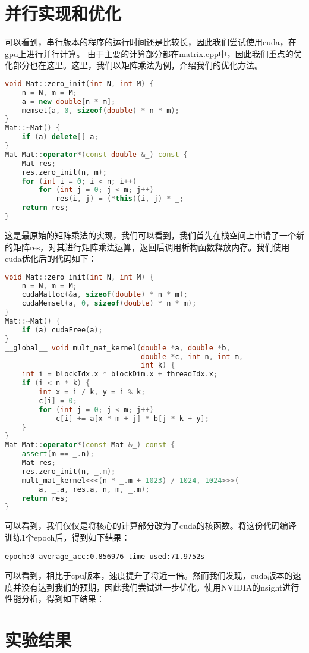 \documentclass{ctexart}
\begin{document}
\begin{sloppypar}
\section{并行实现和优化}
可以看到，串行版本的程序的运行时间还是比较长，因此我们尝试使用cuda，在gpu上进行并行计算。
由于主要的计算部分都在matrix.cpp中，因此我们重点的优化部分也在这里。这里，我们以矩阵乘法为例，介绍我们的优化方法。
\begin{lstlisting}[language=C++]
void Mat::zero_init(int N, int M) {
    n = N, m = M;
    a = new double[n * m];
    memset(a, 0, sizeof(double) * n * m);
}
Mat::~Mat() {
    if (a) delete[] a;
}
Mat Mat::operator*(const double &_) const {
    Mat res;
    res.zero_init(n, m);
    for (int i = 0; i < n; i++)
        for (int j = 0; j < m; j++)
            res(i, j) = (*this)(i, j) * _;
    return res;
}
\end{lstlisting}
这是最原始的矩阵乘法的实现，我们可以看到，我们首先在栈空间上申请了一个新的矩阵res，对其进行矩阵乘法运算，返回后调用析构函数释放内存。我们使用cuda优化后的代码如下：
\begin{lstlisting}[language=C++]
void Mat::zero_init(int N, int M) {
    n = N, m = M;
    cudaMalloc(&a, sizeof(double) * n * m);
    cudaMemset(a, 0, sizeof(double) * n * m);
}
Mat::~Mat() {
    if (a) cudaFree(a);
}
__global__ void mult_mat_kernel(double *a, double *b,
                                double *c, int n, int m,
                                int k) {
    int i = blockIdx.x * blockDim.x + threadIdx.x;
    if (i < n * k) {
        int x = i / k, y = i % k;
        c[i] = 0;
        for (int j = 0; j < m; j++)
            c[i] += a[x * m + j] * b[j * k + y];
    }
}
Mat Mat::operator*(const Mat &_) const {
    assert(m == _.n);
    Mat res;
    res.zero_init(n, _.m);
    mult_mat_kernel<<<(n * _.m + 1023) / 1024, 1024>>>(
        a, _.a, res.a, n, m, _.m);
    return res;
}
\end{lstlisting}
可以看到，我们仅仅是将核心的计算部分改为了cuda的核函数。将这份代码编译训练1个epoch后，得到如下结果：
\begin{lstlisting}
epoch:0 average_acc:0.856976 time used:71.9752s
\end{lstlisting}
可以看到，相比于cpu版本，速度提升了将近一倍。然而我们发现，cuda版本的速度并没有达到我们的预期，因此我们尝试进一步优化。使用NVIDIA的nsight进行性能分析，得到如下结果：

\section{实验结果}




\end{sloppypar}
\end{document}
